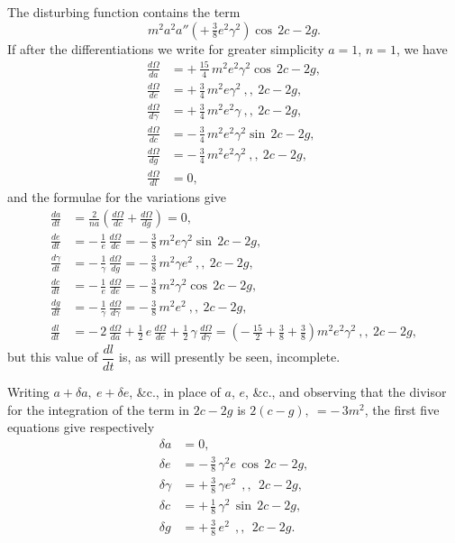 \documentclass[11pt]{article}
\begin{document}
The disturbing function contains the term
\[
m^{2}a^{2}a''\left(+\,\tfrac{3}{8}e^{2}\gamma^{2}\right)\cos\,2c - 2g.
\]
If after the differentiations we write for greater simplicity $a = 1$,
$n = 1$, we have
\begin{align*}
\frac{d\Omega}{da} &= +\,\tfrac{15}{4}\,m^{2}e^{2}\gamma^{2}\cos\,2c - 2g, \\
\frac{d\Omega}{de} &= +\,\tfrac{3}{4}\,m^{2}e\gamma^{2}\ ,, \ 2c - 2g, \\
\frac{d\Omega}{d\gamma} &= +\,\tfrac{3}{4}\,m^{2}e^{2}\gamma\ ,, \ 2c - 2g, \\
\frac{d\Omega}{dc} &= -\,\tfrac{3}{4}\,m^{2}e^{2}\gamma^{2}\sin\,2c - 2g, \\
\frac{d\Omega}{dg} &= -\,\tfrac{3}{4}\,m^{2}e^{2}\gamma^{2}\ ,, \ 2c - 2g, \\
\frac{d\Omega}{dl} &= 0,
\end{align*}
and the formulae for the variations give
\begin{align*}
\frac{da}{dt} &= \frac{2}{na}\!\left(\frac{d\Omega}{dc} + \frac{d\Omega}{dg}\right)
   = 0, \\
\frac{de}{dt} &= -\,\frac{1}{e}\,\frac{d\Omega}{dc}
   = -\,\tfrac{3}{8}\,m^{2}e\gamma^{2}\sin\,2c - 2g, \\
\frac{d\gamma}{dt} &= -\,\frac{1}{\gamma}\,\frac{d\Omega}{dg}
   = -\,\tfrac{3}{8}\,m^{2}\gamma e^{2}\ ,, \ 2c - 2g, \\
\frac{dc}{dt} &= -\,\frac{1}{e}\,\frac{d\Omega}{de}
   = -\,\tfrac{3}{8}\,m^{2}\gamma^{2}\cos\,2c - 2g, \\
\frac{dg}{dt} &= -\,\frac{1}{\gamma}\,\frac{d\Omega}{d\gamma}
   = -\,\tfrac{3}{8}\,m^{2}e^{2}\ ,, \ 2c - 2g, \\
\frac{dl}{dt} &= -\,2\,\frac{d\Omega}{da} + \tfrac{1}{2}\,e\,\frac{d\Omega}{de}
   + \tfrac{1}{2}\,\gamma\,\frac{d\Omega}{d\gamma}
   = \left(-\,\tfrac{15}{2} + \tfrac{3}{8} + \tfrac{3}{8}\right)m^{2}e^{2}\gamma^{2}\ ,, \ 2c - 2g,
\end{align*}
but this value of $\dfrac{dl}{dt}$ is, as will presently be seen,
incomplete.

Writing $a + \delta a,\ e + \delta e$, \&c., in place of $a$, $e$,
\&c., and observing that the divisor for the integration of the term
in $2c - 2g$ is $2(c - g),\ = -\,3m^{2}$, the first five equations give
respectively
\begin{align*}
\delta a &= 0, \\
\delta e &= -\,\tfrac{3}{8}\,\gamma^{2}e\,\cos\,2c - 2g, \\
\delta \gamma &= +\,\tfrac{3}{8}\,\gamma e^{2}\ \ ,, \ \ 2c - 2g, \\
\delta c &= +\,\tfrac{1}{8}\,\gamma^{2}\,\sin\,2c - 2g, \\
\delta g &= +\,\tfrac{3}{8}\,e^{2}\ \ ,, \ \ 2c - 2g.
\end{align*}
\end{document}
